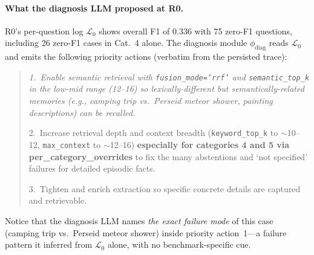 \paragraph{What the diagnosis LLM proposed at R0.} R0's per-question log $\mathcal{L}_0$ shows overall F1 of 0.336 with 75 zero-F1 questions, including 26 zero-F1 cases in Cat.~4 alone. The diagnosis module $\phi_{\text{diag}}$ reads $\mathcal{L}_0$ and emits the following priority actions (verbatim from the persisted trace):
\begin{quote}\small\itshape
1.~Enable semantic retrieval with \texttt{fusion\_mode='rrf'} and \texttt{semantic\_top\_k} in the low-mid range (12--16) so lexically-different but semantically-related memories (e.g., camping trip vs.\ Perseid meteor shower, painting descriptions) can be recalled.

2.~Increase retrieval depth and context breadth (\texttt{keyword\_top\_k} to $\sim$10--12, \texttt{max\_context} to $\sim$12--16) \textbf{especially for categories 4 and 5 via per\_category\_overrides} to fix the many abstentions and `not specified' failures for detailed episodic facts.

3.~Tighten and enrich extraction so specific concrete details are captured and retrievable.
\end{quote}
Notice that the diagnosis LLM names \emph{the exact failure mode} of this case (camping trip vs.\ Perseid meteor shower) inside priority action~1---a failure pattern it inferred from $\mathcal{L}_0$ alone, with no benchmark-specific cue.


